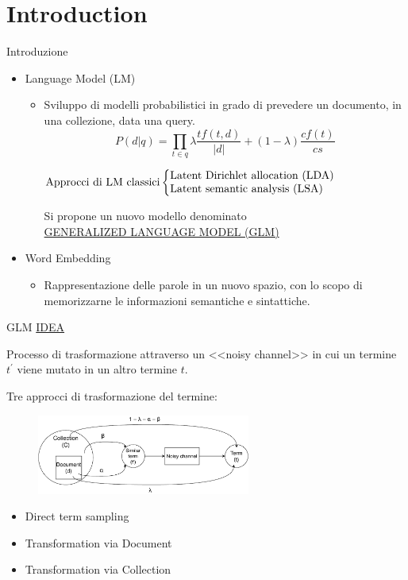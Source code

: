 \section{Introduction}
\begin{frame}{Introduzione}
    \begin{itemize}
        \item Language Model (LM)
              \begin{itemize}
                  \item Sviluppo di modelli probabilistici in grado di prevedere un documento, in una collezione, data una query.
                        \[P(d|q) = \prod_{t\in q}^{ } \lambda \frac{tf(t,d)}{|d|} + (1 - \lambda) \frac{cf(t)}{cs}\]

                        \(
                        \text{Approcci di LM classici} \left\lbrace\parbox{7cm}{Latent Dirichlet allocation (LDA) \\ Latent semantic analysis (LSA)}\right.
                        \)

                        \begin{center}
                            Si propone un nuovo modello denominato\\ \underline{GENERALIZED LANGUAGE MODEL (GLM)}
                        \end{center}
              \end{itemize}
        \item Word Embedding
              \begin{itemize}
                  \item Rappresentazione delle parole in un nuovo spazio, con lo scopo di memorizzarne le informazioni semantiche e sintattiche.
              \end{itemize}
    \end{itemize}
\end{frame}

\begin{frame}{GLM}
    \underline{IDEA}

    Processo di trasformazione attraverso un <<noisy channel>> in cui un termine \(t^{'}\) viene mutato in un altro termine \(t\).

    \bigskip
    Tre approcci di trasformazione del termine:
    \begin{figure}
        \centering
        \includegraphics[width=7cm]{img/glm.pdf}
    \end{figure}
    \begin{itemize}
        \item Direct term sampling
        \item Transformation via Document
        \item Transformation via Collection
    \end{itemize}
\end{frame}

